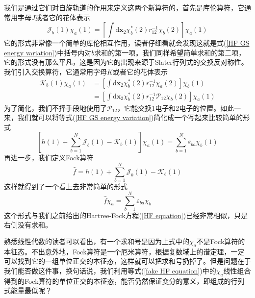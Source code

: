 \documentclass[12pt,a4paper,openany,twoside]{book}
\numberwithin{equation}{section}
\begin{document}
          我们是通过它们对自旋轨道的作用来定义这两个新算符的，首先是库伦算符，它通常用字母$J$或者它的花体表示
          \begin{equation}
            \mathscr{J}_{b}(1) \chi_{a}(1)=\left[\int \mathrm{d} \mathbf{x}_{2} \chi_{b}^{*}(2) r_{12}^{-1} \chi_{b}(2)\right] \chi_{a}(1)
            \label{Coulomb operator}
          \end{equation}
          它的形式非常像一个简单的库伦相互作用，读者仔细看就会发现这就是式(\ref{HF GS energy variation})中括号内对$b$求和的第一项。我们同样希望简单求和的第二项，它的形式没有那么平凡，这是因为它的出现来源于Slater行列式的交换反对称性。我们引入交换算符，它通常用字母$K$或者它的花体表示
          \begin{equation}
            \begin{aligned} \mathscr{K}_{b}(1) \chi_{a}(1) &=\left[\int \mathrm{d} \mathbf{x}_{2} \chi_{b}^{*}(2) r_{12}^{-1} \chi_{a}(2)\right] \chi_{b}(1) \\ &=\left[\int \mathrm{d} \mathbf{x}_{2} \chi_{b}^{*}(2) r_{12}^{-1} \mathscr{P}_{12} \chi_{b}(2)\right] \chi_{a}(1) \end{aligned}
            \label{Exchange operator}
          \end{equation}
          为了简化，我们\sout{不择手段地}使用了$\mathscr{P}_{12}$，它能交换1电子和2电子的位置。如此一来，我们就可以将等式(\ref{HF GS energy variation})简化成一个写起来比较简单的形式
          \begin{equation}
            \left[h(1)+\sum_{b=1}^{N} \mathscr{J}_{b}(1)-\mathscr{K}_{b}(1)\right] \chi_{a}(1)=\sum_{b=1}^{N} \varepsilon_{b a} \chi_{b}(1)
          \end{equation}
          再进一步，我们定义Fock算符
          \begin{equation}
            \hat{f} = h(1)+\sum_{b=1}^{N} \mathscr{J}_{b}(1)-\mathscr{K}_{b}(1)
            \label{Fock operator}
          \end{equation}
          这样就得到了一个看上去非常简单的形式
          \begin{equation}
            \hat{f}  \chi_{a} =\sum_{b=1}^{N} \varepsilon_{b a}  \chi_{b} 
            \label{fake HF equation}
          \end{equation}
          这个形式与我们之前给出的Hartree-Fock方程(\ref{HF equation})已经非常相似，只是右侧没有求和。

          熟悉线性代数的读者可以看出，有一个求和号是因为上式中的$\chi_{a}$不是Fock算符的本征态。不出意外地，Fock算符是一个厄米算符，根据复数域上的谱定理，一定可以找到它的一组单位正交的本征态，这样就可以把求和号扔掉了。但是问题在于我们能否做这件事，换句话说，我们利用等式(\ref{fake HF equation})中的$\chi_{a}$线性组合得到的Fock算符的单位正交的本征态，能否仍然保证变分的意义，即组成的行列式能量最低呢？
          
\end{document}
